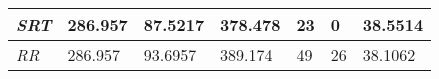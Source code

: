 \documentclass{article}
\begin{document}
\begin{table}[h!]
\begin{tabular}{|l|l|l|l|l|l|l|}
  \textit{SRT}       & 286.957                                                                          & 87.5217                                                                     & 378.478                                                                            & 23                                                                                    & 0                                                                                   & 38.5514                                                                    \\ \hline
  \textit{RR}        & 286.957                                                                          & 93.6957                                                                     & 389.174                                                                            & 49                                                                                    & 26                                                                                  & 38.1062                                                                    \\ \hline
  \end{tabular}
  \label{table:2}
\end{table}
\end{document}
